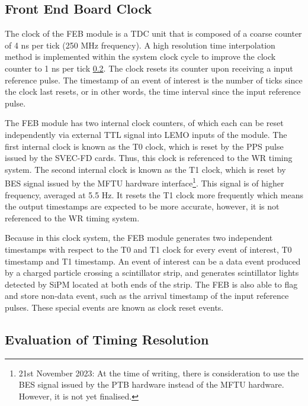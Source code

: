 
\subsection{Front End Board Clock}

The clock of the FEB module is a TDC unit that is composed of a coarse counter of 4 ns per tick (250 MHz frequency). 
A high resolution time interpolation method is implemented within the system clock cycle to improve the clock counter to 1 ns per tick \ref{}.
The clock resets its counter upon receiving a input reference pulse.  
The timestamp of an event of interest is the number of ticks since the clock last resets, or in other words, the time interval since the input reference pulse.

The FEB module has two internal clock counters, of which each can be reset independently via external TTL signal into LEMO inputs of the module.
The first internal clock is known as the T0 clock, which is reset by the PPS pulse issued by the SVEC-FD cards. 
Thus, this clock is referenced to the WR timing system.
The second internal clock is known as the T1 clock, which is reset by BES signal issued by the MFTU hardware interface\footnote{21st November 2023: At the time of writing, there is consideration to use the BES signal issued by the PTB hardware instead of the MFTU hardware. However, it is not yet finalised. }.
This signal is of higher frequency, averaged at 5.5 Hz.
It resets the T1 clock more frequently which means the output timestamps are expected to be more accurate, however, it is not referenced to the WR timing system.

Because in this clock system, the FEB module generates two independent timestamps with respect to the T0 and T1 clock for every event of interest, T0 timestamp and T1 timestamp.
An event of interest can be a data event produced by a charged particle crossing a scintillator strip, and generates scintillator lights detected by SiPM located at both ends of the strip. 
The FEB is also able to flag and store non-data event, such as the arrival timestamp of the input reference pulses. 
These special events are known as clock reset events.

\subsection{Evaluation of Timing Resolution}

